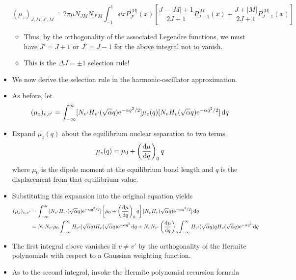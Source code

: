 \documentclass[../notes.tex]{subfiles}
\begin{document}
\begin{itemize}
    \begin{equation*}
        (\mu_z)_{J,M;J',M} = 2\pi\mu N_{JM}N_{J'M}\int_{-1}^1\dd{x}P_{J'}^{|M|}(x)\left[ \frac{J-|M|+1}{2J+1}P_{J+1}^{|M|}(x)+\frac{J+|M|}{2J+1}P_{J-1}^{|M|}(x) \right]
    \end{equation*}
    \begin{itemize}
        \item Thus, by the orthogonality of the associated Legendre functions, we must have $J'=J+1$ or $J'=J-1$ for the above integral not to vanish.
        \item This is the $\Delta J=\pm 1$ selection rule!
    \end{itemize}
    \item We now derive the selection rule in the harmonic-oscillator approximation.
    \item As before, let
    \begin{equation*}
        (\mu_z)_{v,v'} = \int_{-\infty}^\infty[N_{v'}H_{v'}(\sqrt{\alpha}q)\e[-\alpha q^2/2]]\mu_z(q)[N_vH_v(\sqrt{\alpha}q)\e[-\alpha q^2/2]]\dd{q}
    \end{equation*}
    \item Expand $\mu_z(q)$ about the equilibrium nuclear separation to two terms
    \begin{equation*}
        \mu_z(q) = \mu_0+\left( \dv{\mu}{q} \right)_0q
    \end{equation*}
    where $\mu_0$ is the dipole moment at the equilibrium bond length and $q$ is the displacement from that equilibrium value.
    \item Substituting this expansion into the original equation yields
    \begin{align*}
        (\mu_z)_{v,v'} &= \int_{-\infty}^\infty[N_{v'}H_{v'}(\sqrt{\alpha}q)\e[-\alpha q^2/2]]\left[ \mu_0+\left( \dv{\mu}{q} \right)_0q \right][N_vH_v(\sqrt{\alpha}q)\e[-\alpha q^2/2]]\dd{q}\\
        &= N_vN_{v'}\mu_0\int_{-\infty}^\infty H_{v'}(\sqrt{\alpha}q)H_v(\sqrt{\alpha}q)\e[-\alpha q^2]\dd{q}+N_vN_{v'}\left( \dv{\mu}{q} \right)_0\int_{-\infty}^\infty H_{v'}(\sqrt{\alpha}q)qH_v(\sqrt{\alpha}q)\e[-\alpha q^2]\dd{q}
    \end{align*}
    \item The first integral above vanishes if $v\neq v'$ by the orthogonality of the Hermite polynomials with respect to a Gaussian weighting function.
    \item As to the second integral, invoke the Hermite polynomial recursion formula
    \begin{equation*}

\end{equation*}
\end{itemize}
\end{document}
